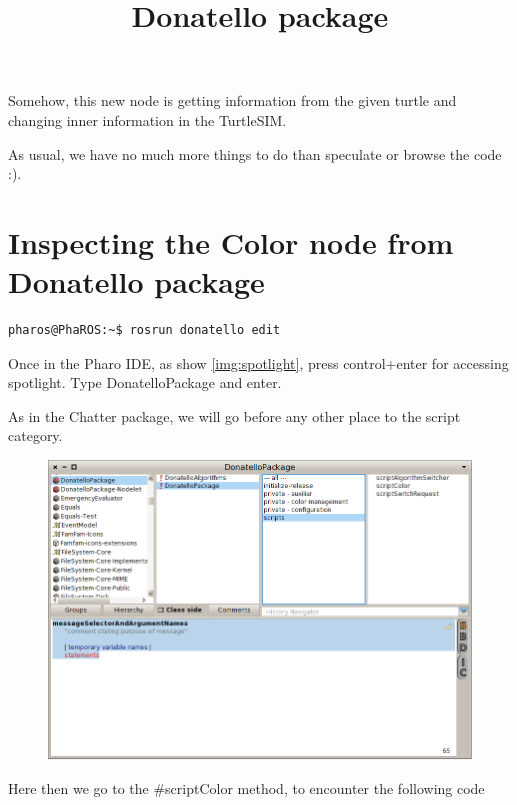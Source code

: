 \documentclass[a4paper,10pt,twoside]{book}
\begin{document}
			Somehow, this new node is getting information from the given turtle and changing inner information in the TurtleSIM.
			
			As usual, we have no much more things to do than speculate or browse the code :). 
			
			
			\section{Inspecting the Color node from Donatello package}
			
			 
			 
			 \begin{lstlisting}[language=bash,title={ Editing }]
				pharos@PhaROS:~$ rosrun donatello edit
			\end{lstlisting}
			
			Once in the Pharo IDE, as show \autoref{img:spotlight}, press control+enter for accessing spotlight. Type DonatelloPackage and enter. 
			
			As in the Chatter package, we will go before any other place to the script category. 
			
			\begin{figure}[!htbp]
  				\centering
    				\includegraphics[width=1\textwidth]{DonatelloPackage.png}
				\centering
				
				\title{ Donatello package }
			\end{figure}
			
			
			Here then we go to the \#scriptColor method, to encounter the following code
			
\end{document}

